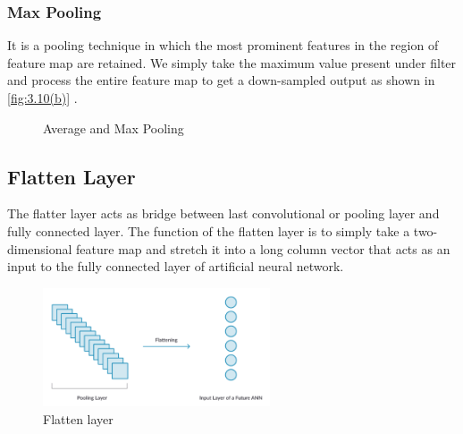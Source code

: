 \subsubsection{Max Pooling}
It is a pooling technique in which the most prominent 
features in the region of feature map are retained. We simply 
take the maximum value present under filter and process the entire 
feature map to get a down-sampled output as shown in \ref{fig:3.10(b)} \cite{chap_3_article:6}.

\begin{figure}%
    \centering
    \qquad
    \caption{Average and Max Pooling}%
    \label{fig:3.10}%
\end{figure}

\subsection{Flatten Layer}

The flatter layer acts as bridge between last convolutional or pooling layer 
and fully connected layer. The function of the flatten layer is to simply take
a two-dimensional feature map and stretch it into a long column vector that acts as 
an input to the fully connected layer of artificial neural network.


\begin{figure}[H]
	\centering
		\includegraphics[width=0.60\textwidth]{CHAPTERS/Chapter-3/Images/3.11}
	\caption{Flatten layer}
	\label{fig:3.11}
\end{figure}


